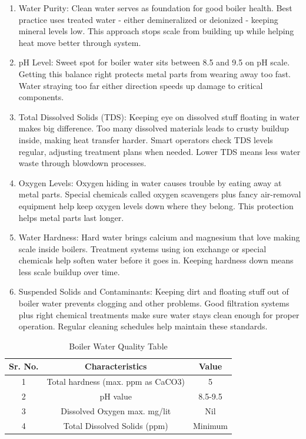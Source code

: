 \begin{enumerate}
    \item Water Purity:
    Clean water serves as foundation for good boiler health. Best practice uses treated water - either demineralized or deionized - keeping mineral levels low. This approach stops scale from building up while helping heat move better through system.
    \item pH Level:
    Sweet spot for boiler water sits between 8.5 and 9.5 on pH scale. Getting this balance right protects metal parts from wearing away too fast. Water straying too far either direction speeds up damage to critical components.
    \item Total Dissolved Solids (TDS):
    Keeping eye on dissolved stuff floating in water makes big difference. Too many dissolved materials leads to crusty buildup inside, making heat transfer harder. Smart operators check TDS levels regular, adjusting treatment plans when needed. Lower TDS means less water waste through blowdown processes.
    \item Oxygen Levels:
    Oxygen hiding in water causes trouble by eating away at metal parts. Special chemicals called oxygen scavengers plus fancy air-removal equipment help keep oxygen levels down where they belong. This protection helps metal parts last longer.
    \item Water Hardness:
    Hard water brings calcium and magnesium that love making scale inside boilers. Treatment systems using ion exchange or special chemicals help soften water before it goes in. Keeping hardness down means less scale buildup over time.
    \item Suspended Solids and Contaminants:
    Keeping dirt and floating stuff out of boiler water prevents clogging and other problems. Good filtration systems plus right chemical treatments make sure water stays clean enough for proper operation. Regular cleaning schedules help maintain these standards.
\end{enumerate}

\begin{table}[h]
\centering
\begin{tabular}{|c|c|c|}
\hline
\textbf{Sr. No.} & \textbf{Characteristics} & \textbf{Value} \\
\hline
1 & Total hardness (max. ppm as CaCO3) & 5 \\
\hline
2 & pH value & 8.5-9.5 \\
\hline
3 & Dissolved Oxygen max. mg/lit & Nil \\
\hline
4 & Total Dissolved Solids (ppm) & Minimum \\
\hline
\end{tabular}
\caption{Boiler Water Quality Table}
\label{tab:boiler-water-quality}
\end{table}

